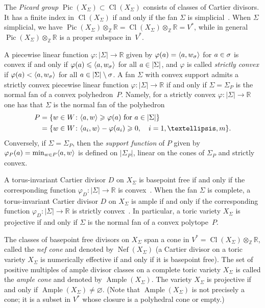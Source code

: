\documentclass[a4paper]{amsart}
\theoremstyle{definition}
\theoremstyle{remark}
\numberwithin{equation}{section}
\def\R{\mathbb R}
\def\R{\mathbb R}
\def\Z{\mathbb Z}
\newcommand{\mb}[1]{{\textbf {\textit#1}}}
\renewcommand{\ge}{\geqslant}
\renewcommand{\le}{\leqslant}
\newcommand{\<}{\langle}
\renewcommand{\>}{\rangle}
\begin{document}
The \emph{Picard group} $\mathop{\mathrm{Pic}}(X_\Sigma)\subset\mathop{\mathrm{Cl}}(X_\Sigma)$ consists of classes of Cartier divisors. It has a finite index in $\mathop{\mathrm{Cl}}(X_\Sigma)$ if and only if the fan $\Sigma$ is simplicial~\cite[Proposition~4.2.7]{c-l-s11}. When $\Sigma$ simplicial, we have
$\mathop\mathrm{Pic}(X_\Sigma)\otimes_\Z\R=\mathop\mathrm{Cl}(X_\Sigma)\otimes_\Z\R=V^*$, while in general $\mathop\mathrm{Pic}(X_\Sigma)\otimes_\Z\R$ is a proper subspace in~$V^*$.

A piecewise linear function $\varphi\colon|\Sigma|\to\R$ given by $\varphi(\mb a)=\langle \mb a,\mb w_\sigma\rangle$ for $\mb a\in\sigma$ is convex if and only if $\varphi(\mb a)\le\langle \mb a,\mb w_\sigma\rangle$ for all $\mb a\in|\Sigma|$, and $\varphi$ is called \emph{strictly convex} if $\varphi(\mb a)<\langle \mb a,\mb w_\sigma\rangle$ for all $\mb a\in|\Sigma|\setminus\sigma$. A fan $\Sigma$ with convex support admits a strictly convex piecewise linear function $\varphi\colon|\Sigma|\to\R$ if and only if $\Sigma=\Sigma_P$ is the normal fan of a convex polyhedron~$P$. Namely, for a strictly convex $\varphi\colon|\Sigma|\to\R$ one has that $\Sigma$ is the normal fan of the polyhedron
\begin{align*}
  P&=\{\mb w\in W\colon \langle\mb a,\mb w\rangle\ge\varphi(\mb a)
  \text{ for }\mb a\in|\Sigma|\}\\
  &=
  \{\mb w\in W\colon \langle\mb a_i,\mb w\rangle-\varphi(\mb a_i)\ge0,\quad 
  i=1,\ldots,m\}.
\end{align*}
Conversely, if $\Sigma=\Sigma_P$, then the \emph{support function} of $P$ given by $\varphi_P(\mb a)=\min_{\mb w\in P}\langle\mb a,\mb w\rangle$ is defined on 
$|\Sigma_P|$, linear on the cones of $\Sigma_P$ and strictly convex. 

A torus-invariant Cartier divisor $D$ on $X_\Sigma$ is basepoint free if and only if the corresponding function $\varphi_D\colon|\Sigma|\to\R$ is convex~\cite[Theorem~6.1.7]{c-l-s11}. When the fan $\Sigma$ is complete, a torus-invariant Cartier divisor $D$ on $X_\Sigma$ is ample if and only if the corresponding function $\varphi_D\colon|\Sigma|\to\R$ is strictly convex~\cite[Theorem~6.1.14]{c-l-s11}. In particular, a toric variety $X_\Sigma$ is projective if and only if $\Sigma$ is the normal fan of a convex polytope~$P$.

The classes of basepoint free divisors on $X_\Sigma$ span a cone in $V^*=\mathop\mathrm{Cl}(X_\Sigma)\otimes_\Z\R$, called the \emph{nef cone} and denoted by $\mathop\mathrm{Nef}(X_\Sigma)$ (a Cartier divisor on a toric variety $X_\Sigma$ is numerically effective if and only if it is basepoint free). The set of positive multiples of ample divisor classes on a complete toric variety $X_\Sigma$ is called the \emph{ample cone} and denoted by $\mathop\mathrm{Ample}(X_\Sigma)$. The variety $X_\Sigma$ is projective if and only if $\mathop\mathrm{Ample}(X_\Sigma)\ne\varnothing$. (Note that $\mathop\mathrm{Ample}(X_\Sigma)$ is not precisely a cone; it is a subset in $V^*$ whose closure is a polyhedral cone or empty.)  
\end{document}
